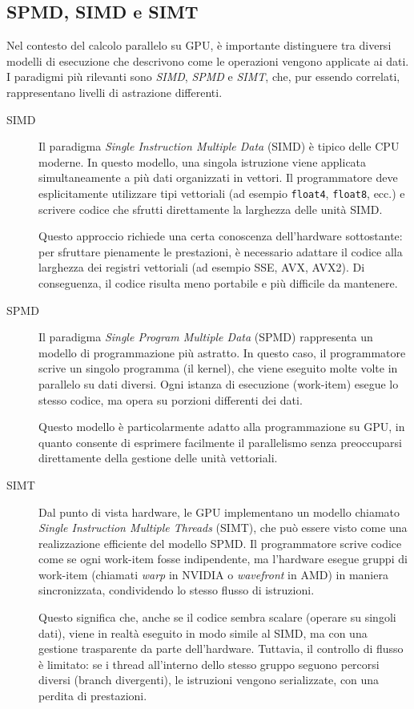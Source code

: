 \subsection{SPMD, SIMD e SIMT}

Nel contesto del calcolo parallelo su GPU, è importante distinguere tra diversi modelli di esecuzione che descrivono come le operazioni vengono applicate ai dati. I paradigmi più rilevanti sono \emph{SIMD}, \emph{SPMD} e \emph{SIMT}, che, pur essendo correlati, rappresentano livelli di astrazione differenti.
\begin{description}
\item[SIMD] Il paradigma \emph{Single Instruction Multiple Data} (SIMD) è tipico delle CPU moderne. In questo modello, una singola istruzione viene applicata simultaneamente a più dati organizzati in vettori. Il programmatore deve esplicitamente utilizzare tipi vettoriali (ad esempio \texttt{float4}, \texttt{float8}, ecc.) e scrivere codice che sfrutti direttamente la larghezza delle unità SIMD.

Questo approccio richiede una certa conoscenza dell'hardware sottostante: per sfruttare pienamente le prestazioni, è necessario adattare il codice alla larghezza dei registri vettoriali (ad esempio SSE, AVX, AVX2). Di conseguenza, il codice risulta meno portabile e più difficile da mantenere.

\item[SPMD] Il paradigma \emph{Single Program Multiple Data} (SPMD) rappresenta un modello di programmazione più astratto. In questo caso, il programmatore scrive un singolo programma (il kernel), che viene eseguito molte volte in parallelo su dati diversi. Ogni istanza di esecuzione (work-item) esegue lo stesso codice, ma opera su porzioni differenti dei dati.

Questo modello è particolarmente adatto alla programmazione su GPU, in quanto consente di esprimere facilmente il parallelismo senza preoccuparsi direttamente della gestione delle unità vettoriali.

\item[SIMT] Dal punto di vista hardware, le GPU implementano un modello chiamato \emph{Single Instruction Multiple Threads} (SIMT), che può essere visto come una realizzazione efficiente del modello SPMD. Il programmatore scrive codice come se ogni work-item fosse indipendente, ma l'hardware esegue gruppi di work-item (chiamati \emph{warp} in NVIDIA o \emph{wavefront} in AMD) in maniera sincronizzata, condividendo lo stesso flusso di istruzioni.

Questo significa che, anche se il codice sembra scalare (operare su singoli dati), viene in realtà eseguito in modo simile al SIMD, ma con una gestione trasparente da parte dell'hardware. Tuttavia, il controllo di flusso è limitato: se i thread all'interno dello stesso gruppo seguono percorsi diversi (branch divergenti), le istruzioni vengono serializzate, con una perdita di prestazioni.
\end{description}

